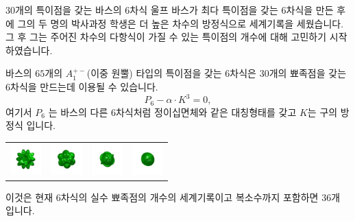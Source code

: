 \begin{surferPage}{$30$개의 특이점을 갖는 바스의 $6$차식}
	울프 바스가 최다 특이점을 갖는 $6$차식을 만든 후에 그의 두 명의 박사과정 학생은 더 높은 차수의 방정식으로 세계기록을 세웠습니다. 그 후 그는 주어진 차수의 다항식이 가질 수 있는 특이점의 개수에 대해 고민하기 시작하였습니다. 

바스의 $65$개의 $A_1^{+-}$(이중 원뿔) 타입의 특이점을 갖는 $6$차식은 $30$개의 뾰족점을 갖는 $6$차식을 만드는데 이용될 수 있습니다. 
    \[P_6 - \alpha \cdot K^3=0,\]
여기서 $P_6$ 는 바스의 다른 $6$차식처럼 정이십면체와 같은 대칭형태를 갖고 $K$는 구의 방정식 입니다. 
    \vspace*{-0.4em}
    \begin{center}
      \begin{tabular}{c@{\ }c@{\ }c@{\ }c}
        \includegraphics[height=1.2cm]{./../../common/images/barthsextic_30A2}
        &
        \includegraphics[height=1.2cm]{./../../common/images/barthsextic_30A2_3}
        &
        \includegraphics[height=1.2cm]{./../../common/images/barthsextic_30A2_5}
        &
        \includegraphics[height=1.2cm]{./../../common/images/barthsextic_30A2_6}
      \end{tabular}
    \end{center}    
    \vspace*{-0.3em}
이것은 현재 $6$차식의 실수 뾰족점의 개수의 세계기록이고 복소수까지 포함하면 $36$개 입니다.
\end{surferPage}
